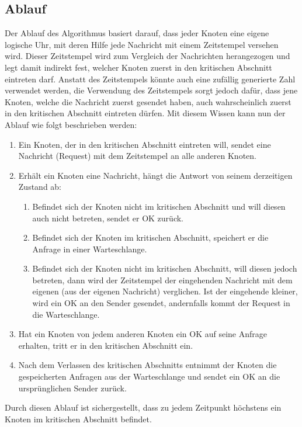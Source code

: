 \documentclass{article}
\begin{document}
\subsection{Ablauf}\label{ablauf}
Der Ablauf des Algorithmus basiert darauf, dass jeder Knoten eine eigene logische Uhr, mit deren Hilfe jede Nachricht mit einem Zeitstempel versehen wird. Dieser Zeitstempel wird zum Vergleich der Nachrichten herangezogen und legt damit indirekt fest, welcher Knoten zuerst in den kritischen Abschnitt eintreten darf. Anstatt des Zeitstempels könnte auch eine zufällig generierte Zahl verwendet werden, die Verwendung des Zeitstempels sorgt jedoch dafür, dass jene Knoten, welche die Nachricht zuerst gesendet haben, auch wahrscheinlich zuerst in den kritischen Abschnitt eintreten dürfen. Mit diesem Wissen kann nun der Ablauf wie folgt beschrieben werden\cite{VerteilteSysteme}:
\begin{enumerate}
    \item Ein Knoten, der in den kritischen Abschnitt eintreten will, sendet eine Nachricht (Request) mit dem Zeitstempel an alle anderen Knoten.
    \item Erhält ein Knoten eine Nachricht, hängt die Antwort von seinem derzeitigen Zustand ab:
    \begin{enumerate}
        \item Befindet sich der Knoten nicht im kritischen Abschnitt und will diesen auch nicht betreten, sendet er OK zurück.
        \item Befindet sich der Knoten im kritischen Abschnitt, speichert er die Anfrage in einer Warteschlange.
        \item  Befindet sich der Knoten nicht im kritischen Abschnitt, will diesen jedoch betreten, dann wird der Zeitstempel der eingehenden Nachricht mit dem eigenen (aus der eigenen Nachricht) verglichen. Ist der eingehende kleiner, wird ein OK an den Sender gesendet, andernfalls kommt der Request in die Warteschlange.
    \end{enumerate}
    \item Hat ein Knoten von jedem anderen Knoten ein OK auf seine Anfrage erhalten, tritt er in den kritischen Abschnitt ein.
    \item Nach dem Verlassen des kritischen Abschnitts entnimmt der Knoten die gespeicherten Anfragen aus der Warteschlange und sendet ein OK an die ursprünglichen Sender zurück.
\end{enumerate}

Durch diesen Ablauf ist sichergestellt, dass zu jedem Zeitpunkt höchstens ein Knoten im kritischen Abschnitt befindet.
\end{document}
